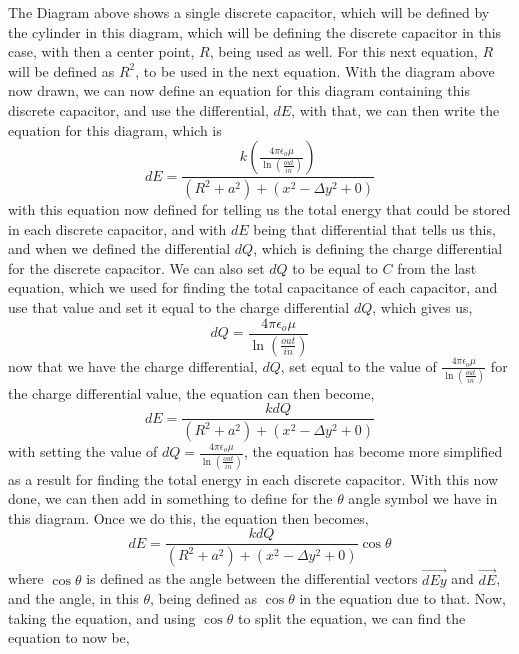 \documentclass[]{article}
\begin{document}
\linebreak
\linebreak
The Diagram above shows a single discrete capacitor, which will be defined by the cylinder in this diagram, which will be defining the discrete capacitor in this case, with then a center point, $R$, being used as well. For this next equation, $R$ will be defined as $R^2$, to be used in the next equation. With the diagram above now drawn, we can now define an equation for this diagram containing this discrete capacitor, and use the differential, $dE$, with that, we can then write the equation for this diagram, which is
\begin{equation}
dE = \frac{k(\frac{4\pi\epsilon_o\mu}{\ln(\frac{out}{in})})}{(R^2+a^2) + (x^2 - \Delta{y}^2+0)}
\end{equation}
with this equation now defined for telling us the total energy that could be stored in each discrete capacitor, and with $dE$ being that differential that tells us this, and when we defined the differential $dQ$, which is defining the charge differential for the discrete capacitor. We can also set $dQ$ to be equal to $C$ from the last equation, which we used for finding the total capacitance of each capacitor, and use that value and set it equal to the charge differential $dQ$, which gives us, 
\linebreak
\[dQ = \frac{4\pi\epsilon_o\mu}{\ln(\frac{out}{in})}\]
now that we have the charge differential, $dQ$, set equal to the value of $\frac{4\pi\epsilon_o\mu}{\ln(\frac{out}{in})}$ for the charge differential value, the equation can then become,
\begin{equation}
dE = \frac{kdQ}{(R^2 + a^2) + (x^2 - \Delta{y}^2+0)} 
\end{equation}
with setting the value of $dQ = \frac{4\pi\epsilon_o\mu}{\ln(\frac{out}{in})}$, the equation has become more simplified as a result for finding the total energy in each discrete capacitor. With this now done, we can then add in something to define for the $\theta$ angle symbol we have in this diagram. Once we do this, the equation then becomes,
\begin{equation}
dE = \frac{kdQ}{(R^2+a^2) + (x^2 - \Delta{y}^2 + 0)} \cos\theta
\end{equation}
where $\cos\theta$ is defined as the angle between the differential vectors $\vec{dEy}$ and $\vec{dE}$, and the angle, in this $\theta$, being defined as $\cos\theta$ in the equation due to that. Now, taking the equation, and using $\cos\theta$ to split the equation, we can find the equation to now be, 
\end{document}
